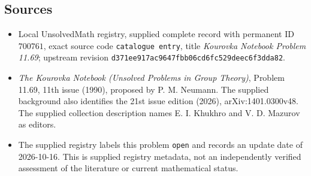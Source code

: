\documentclass[11pt]{article}
\begin{document}
\subsection{Sources}
\begin{itemize}
\item Local UnsolvedMath registry, supplied complete record with permanent ID \(700761\), exact source code \texttt{catalogue entry}, title \emph{Kourovka Notebook Problem 11.69}; upstream revision \texttt{d371ee917ac9647fbb06cd6fc529deec6f3dda82}.
\item \emph{The Kourovka Notebook (Unsolved Problems in Group Theory)}, Problem 11.69, 11th issue (1990), proposed by P. M. Neumann. The supplied background also identifies the 21st issue edition (2026), arXiv:1401.0300v48. The supplied collection description names E. I. Khukhro and V. D. Mazurov as editors.
\item The supplied registry labels this problem \texttt{open} and records an update date of 2026-10-16. This is supplied registry metadata, not an independently verified assessment of the literature or current mathematical status.
\end{itemize}
\end{document}
